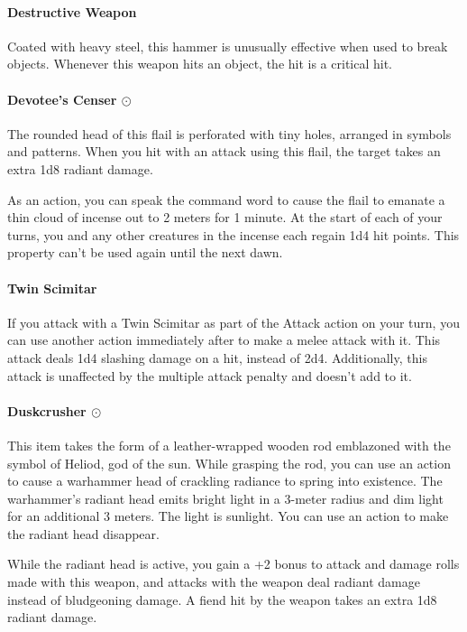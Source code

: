     \paragraph{Destructive Weapon}
        Coated with heavy steel, this hammer is unusually effective when used to break objects.
        Whenever this weapon hits an object, the hit is a critical hit.
    \paragraph{Devotee's Censer $\odot$}
        The rounded head of this flail is perforated with tiny holes, arranged in symbols and patterns.
        When you hit with an attack using this flail, the target takes an extra 1d8 radiant damage.

        As an action, you can speak the command word to cause the flail to emanate a thin cloud of incense out to 2 meters for 1 minute.
        At the start of each of your turns, you and any other creatures in the incense each regain 1d4 hit points.
        This property can't be used again until the next dawn.
    \paragraph{Twin Scimitar}
        If you attack with a Twin Scimitar as part of the Attack action on your turn, you can use another action immediately after to make a melee attack with it.
        This attack deals 1d4 slashing damage on a hit, instead of 2d4.
        Additionally, this attack is unaffected by the multiple attack penalty and doesn't add to it.
    \paragraph{Duskcrusher $\odot$}
        This item takes the form of a leather-wrapped wooden rod emblazoned with the symbol of Heliod, god of the sun.
        While grasping the rod, you can use an action to cause a warhammer head of crackling radiance to spring into existence.
        The warhammer's radiant head emits bright light in a 3-meter radius and dim light for an additional 3 meters.
        The light is sunlight.
        You can use an action to make the radiant head disappear.

        While the radiant head is active, you gain a +2 bonus to attack and damage rolls made with this weapon, and attacks with the weapon deal radiant damage instead of bludgeoning damage.
        A fiend hit by the weapon takes an extra 1d8 radiant damage.

